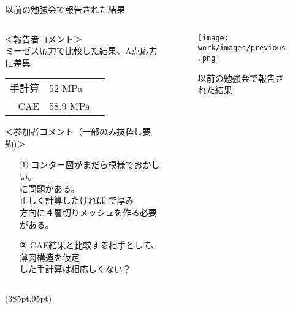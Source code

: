 \begin{frame}{以前の勉強会で報告された結果}
 
    \begin{columns}[t]
    \begin{column}{0.7\textwidth}
       ＜報告者コメント＞ \\
         ミーゼス応力で比較した結果、A点応力に差異 \\
          \begin{table}[hbtp]
            \begin{tabular}{rlp{10em}} %
               手計算 & 52 MPa & \\
               CAE    & 58.9 MPa  & \\
            \end{tabular}
          \end{table}
        ＜参加者コメント（一部のみ抜粋し要約)＞ \\
         \begin{itemize}
            \item[①] コンター図がまだら模様でおかしい。\\
                     に問題がある。 \\
                     正しく計算したければ で厚み\\
                     方向に４層切りメッシュを作る必要がある。\\
            \item[②] CAE結果と比較する相手として、薄肉構造を仮定 \\
                     した手計算は相応しくない？
         \end{itemize}
    \end{column}
    \begin{column}{0.3\textwidth}
      \begin{figure}[htbp]
        \begin{center}
          \texttt{[image: work/images/previous.png]}
            \caption{以前の勉強会で報告された結果} \label{fig:previous}
        \end{center}
      \end{figure}
    \end{column}
  \end{columns}
  \begin{textblock*}{30pt}(385pt,95pt)
  \end{textblock*}
\end{frame}
